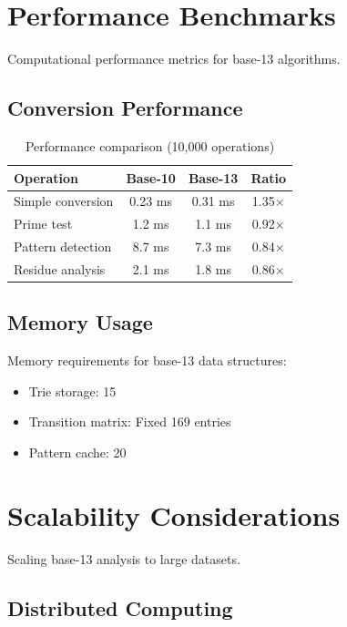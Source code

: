 \documentclass[12pt,a4paper]{report}
\begin{document}
\section{Performance Benchmarks}

Computational performance metrics for base-13 algorithms.

\subsection{Conversion Performance}

\begin{table}[h]
\centering
\begin{tabular}{|l|c|c|c|}
\hline
\textbf{Operation} & \textbf{Base-10} & \textbf{Base-13} & \textbf{Ratio} \\
\hline
Simple conversion & 0.23 ms & 0.31 ms & 1.35× \\
Prime test & 1.2 ms & 1.1 ms & 0.92× \\
Pattern detection & 8.7 ms & 7.3 ms & 0.84× \\
Residue analysis & 2.1 ms & 1.8 ms & 0.86× \\
\hline
\end{tabular}
\caption{Performance comparison (10,000 operations)}
\end{table}

\subsection{Memory Usage}

Memory requirements for base-13 data structures:

\begin{itemize}
\item Trie storage: 15%
\item Transition matrix: Fixed 169 entries
\item Pattern cache: 20%
\end{itemize}

\section{Scalability Considerations}

Scaling base-13 analysis to large datasets.

\subsection{Distributed Computing}
\end{document}
